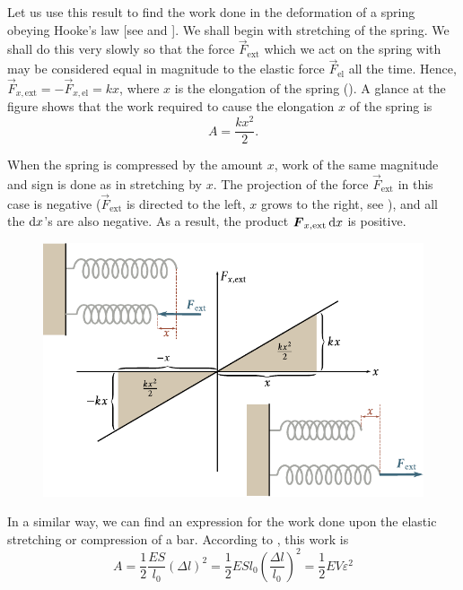 Let us use this result to find the work done in the deformation of a spring obeying Hooke's law [see  and ]. We shall begin with stretching of the spring. We shall do this very slowly so that the force $\vec{F}_{\text{ext}}$ which we act on the spring with may be considered equal in magnitude to the elastic force $\vec{F}_{\text{el}}$ all the time. Hence, $\vec{F}_{x,\text{ext}}=-\vec{F}_{x,\text{el}}=kx$, where $x$ is the elongation of the spring (). A glance at the figure shows that the work required to cause the elongation $x$ of the spring is
\begin{equation}\label{eq:3_13}
A = \frac{kx^2}{2}.
\end{equation}

\noindent
When the spring is compressed by the amount $x$, work of the same magnitude and sign is done as in stretching by $x$. The projection of the force $\vec{F}_{\text{ext}}$ in this case is negative ($\vec{F}_{\text{ext}}$ is directed to the left, $x$ grows to the right, see ), and all the $\mathrm{d} x$'s are also negative. As a result, the product $\boldsymbol{F}_{x,\text{ext}}\,\mathrm{d} x$ is positive.

\begin{figure}[t]
	\begin{center}
		\includegraphics[scale=0.95]{figures/ch_03/fig_3_2.pdf}
		\caption[]{}
		\label{fig:3_2}
	\end{center}
	\vspace{-0.7cm}
\end{figure}

In a similar way, we can find an expression for the work done upon the elastic stretching or compression of a bar. According to , this work is
\begin{equation}\label{eq:3_14}
A = \frac{1}{2}\frac{ES}{l_0}(\Delta l)^2 = \frac{1}{2}ESl_0\left(\frac{\Delta l}{l_0}\right)^2 = \frac{1}{2}EV\varepsilon^2
\end{equation}

